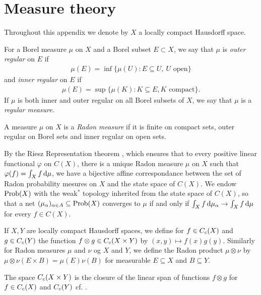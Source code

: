 \appendix
\chapter{Measure theory}
Throughout this appendix we denote by $X$ a locally compact Hausdorff space. 

\begin{definition}
For a Borel measure $\mu$ on $X$ and a Borel subset $E \subset X$, we say that $\mu$ is \emph{outer regular} on $E$ if
\begin{align*}
\mu(E)=\inf\{\mu(U) \colon E \subseteq U, \ U \text{ open}\}
\end{align*}
and \emph{inner regular} on $E$ if 
\begin{align*}
\mu(E)=\sup\{ \mu(K) \colon K \subseteq E, K \text{ compact}\}.
\end{align*}
If $\mu$ is both inner and outer regular on all Borel subsets of $X$, we say that $\mu$ is a \emph{regular measure}.
\end{definition}

\begin{definition}
A measure $\mu$ on $X$ is a \emph{Radon measure} if it is finite on compact sets, outer regular on Borel sets and inner regular on open sets. 
\end{definition}

\noindent By the Riesz Representation theorem \cite[Theorem 7.2][212]{folland2013real}, which ensures that to every positive linear functional $\varphi$ on $C(X)$, there is a unique Radon measure $\mu$ on $X$ such that $\varphi(f)=\int_X f \mathop{}\!\mathrm{d} \mu$, we have a bijective affine correspondance between the set of Radon probability mesures on $X$ and the state space of $C(X)$. We endow $\operatorname{Prob}(X)$ with the weak$^*$ topology inherited from the state space of $C(X)$, so that a net $(\mu_{\alpha})_{\alpha \in A} \subseteq \operatorname{Prob}(X)$ converges to $\mu$ if and only if $\int_X f \mathop{}\!\mathrm{d} \mu_{\alpha} \to \int_X f \mathop{}\!\mathrm{d} \mu$ for every $f \in C(X)$. 

\noindent If $X,Y$ are locally compact Hausdorff spaces, we define for $f \in C_c(X)$ and $g \in C_c(Y)$ the function $f \otimes g \in C_c(X \times Y)$ by $(x,y) \mapsto f(x)g(y)$. Similarly for Radon measures $\mu$ and $\nu$ og $X$ and $Y$, we define the Radon product $\mu \otimes \nu$ by $\mu \otimes \nu (E \times B)=\mu(E) \nu(B)$ for measurable $E \subseteq X$ and $B \subseteq Y$.

The space $C_c(X \times Y)$ is the closure of the linear span of functions $f \otimes g$ for $f \in C_c(X)$ and $C_c(Y)$ cf. \cite[Proposition 7.21][226]{folland2013real}.

